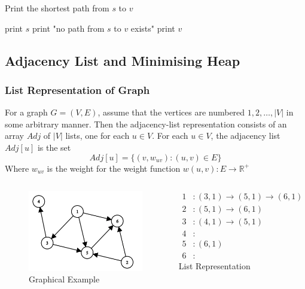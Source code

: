 \documentclass{beamer}
\begin{document}
\begin{frame}
	\begin{algorithm}[H]
		\caption{Print the shortest path from $s$ to $v$}
		\begin{algorithmic}[1]
				\State print \( s \) 
				\ElsIf{$\pi[v] = \phi$}
				\State print "no path from \( s \) to \( v \) exists"
				\Else 
				\State {}
				\State print \( v \) 
				\EndIf
			\EndFunction
		\end{algorithmic}
	\end{algorithm}
\end{frame}


\subsection{Adjacency List and Minimising Heap}
\begin{frame}
	\frametitle{List Representation of Graph}	
	For a graph \( G = (V, E) \), assume that the vertices are numbered \( 1, 2, \hdots, \lvert{ V }\rvert  \) in some arbitrary manner. Then the adjacency-list representation consists of an array \( Adj \) of \( \lvert{ V }\rvert  \) lists, one for each \( u \in V \). For each \( u \in V\), the adjacency list \( Adj[u] \) is the set
	\[
		Adj[u] = \{ (v, w_{uv}) : (u, v) \in E\}
	\]
	Where \( w_{uv} \) is the weight for the weight function \( w(u, v) : E \rightarrow \mathbb{R}^+ \) 
\end{frame}

\begin{frame}
	\begin{columns}
	\begin{figure}
		\includegraphics[scale=0.5]{./pict/exampleGraph.png}
		\caption{Graphical Example}
	\end{figure}

	\begin{align*}
		1 &: (3, 1) \rightarrow (5, 1) \rightarrow (6, 1)\\
		2 &: (5, 1) \rightarrow (6, 1) \\
		3 &: (4, 1) \rightarrow (5, 1) \\
		4 &: \\
		5 &: (6, 1)\\
		6 &: 
	\end{align*}			
	\centering List Representation
			
	\end{columns}
\end{frame}
\end{document}
